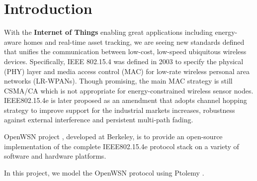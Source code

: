 \section{Introduction}
\label{sec:introduction}

With the \textbf{Internet of Things} enabling great applications including energy-aware homes and real-time asset tracking, we are seeing new standards defined that unifies the communication between low-cost, low-speed ubiquitous wireless devices. Specifically, IEEE 802.15.4 \cite{lan2003part} was defined in 2003 to specify the physical (PHY) layer and media access control (MAC) for low-rate wireless personal area networks (LR-WPANs). Though promising, the main MAC strategy is still CSMA/CA which is not appropriate for energy-constrained wireless sensor nodes. IEEE802.15.4e \cite{IEEE802.15.4e} is later proposed as an amendment that adopts channel hopping strategy to improve support for the industrial markets increases, robustness against external interference and persistent multi-path fading. 

OpenWSN project \cite{watteyne2012openwsn}, developed at Berkeley, is to provide an open-source implementation of the complete IEEE802.15.4e protocol stack on a variety of software and hardware platforms.

In this project, we model the OpenWSN protocol using Ptolemy \cite{davis1999overview, PtolemyVol1:04}. 

